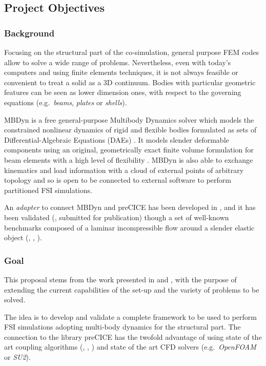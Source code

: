 \subsection*{Project Objectives}


\subsubsection*{Background}

Focusing on the structural part of the co-simulation, general purpose FEM codes allow to solve a wide range of problems. Nevertheless, even with today's computers and using finite elements techniques, it is not always feasible or convenient to treat a solid as a 3D continuum. Bodies with particular geometric features can be seen as lower dimension ones, with respect to the governing equations \cite{hjelmstad2007fundamentals} (e.g.\ \textit{beams}, \textit{plates} or \textit{shells}).

MBDyn is a free general-purpose Multibody Dynamics solver which models the constrained nonlinear dynamics of rigid and flexible bodies formulated as sets of Differential-Algebraic Equations (DAEs) \cite{masarati2014efficient}. It models slender deformable components using an original, geometrically exact finite volume formulation for beam elements with a high level of flexibility \cite{ghiringhelli2000multibody,bauchau2016validation}. MBDyn is also able to exchange kinematics and load information with a cloud of external points of arbitrary topology \cite{quaranta2005conservative} and so is open to be connected to external software to perform partitioned FSI simulations.

An \textit{adapter} to connect MBDyn and preCICE has been developed in \cite{caccia2020master}, and it has been validated (\cite{caccia2021coupling}, submitted for publication) though a set of well-known benchmarks composed of a laminar incompressible flow around a slender elastic object (\cite{ramm1998fluid}, \cite{turek2006proposal}, \cite{turek2010numerical}).

\subsubsection*{Goal}

This proposal stems from the work presented in \cite{caccia2020master} and \cite{caccia2021coupling}, with the purpose of extending the current capabilities of the set-up and the variety of problems to be solved.

The idea is to develop and validate a complete framework to be used to perform FSI simulations adopting multi-body dynamics for the structural part. The connection to the library preCICE has the twofold advantage of using state of the art coupling algorithms (\cite{mehl2016parallel}, \cite{bungartz2016precice}, \cite{degroote2009performance}) and state of the art CFD solvers \cite{uekermann2017official} (e.g.\ \textit{OpenFOAM} or \textit{SU2}).

